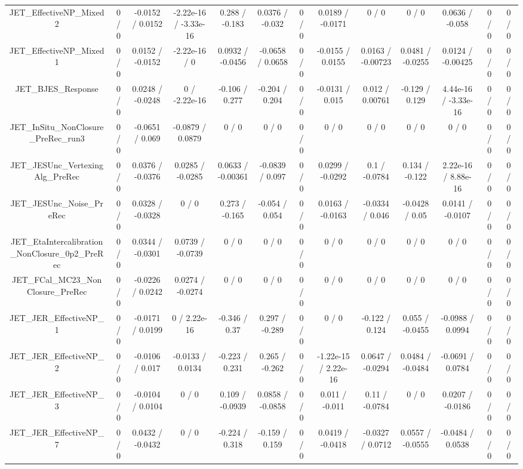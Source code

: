 \documentclass[10pt]{article}
\begin{document}
\begin{table}[htbp]
\begin{center}
\begin{tabular}{|c|c|c|c|c|c|c|c|c|c|c|c|c|}
  JET_EffectiveNP_Mixed2 & 0 / 0 & -0.0152 / 0.0152 & -2.22e-16 / -3.33e-16 & 0.288 / -0.183 & 0.0376 / -0.032 & 0 / 0 & 0.0189 / -0.0171 & 0 / 0 & 0 / 0 & 0.0636 / -0.058 & 0 / 0 & 0 / 0 \\ 
  JET_EffectiveNP_Mixed1 & 0 / 0 & 0.0152 / -0.0152 & -2.22e-16 / 0 & 0.0932 / -0.0456 & -0.0658 / 0.0658 & 0 / 0 & -0.0155 / 0.0155 & 0.0163 / -0.00723 & 0.0481 / -0.0255 & 0.0124 / -0.00425 & 0 / 0 & 0 / 0 \\ 
  JET_BJES_Response & 0 / 0 & 0.0248 / -0.0248 & 0 / -2.22e-16 & -0.106 / 0.277 & -0.204 / 0.204 & 0 / 0 & -0.0131 / 0.015 & 0.012 / 0.00761 & -0.129 / 0.129 & 4.44e-16 / -3.33e-16 & 0 / 0 & 0 / 0 \\ 
  JET_InSitu_NonClosure_PreRec_run3 & 0 / 0 & -0.0651 / 0.069 & -0.0879 / 0.0879 & 0 / 0 & 0 / 0 & 0 / 0 & 0 / 0 & 0 / 0 & 0 / 0 & 0 / 0 & 0 / 0 & 0 / 0 \\ 
  JET_JESUnc_VertexingAlg_PreRec & 0 / 0 & 0.0376 / -0.0376 & 0.0285 / -0.0285 & 0.0633 / -0.00361 & -0.0839 / 0.097 & 0 / 0 & 0.0299 / -0.0292 & 0.1 / -0.0784 & 0.134 / -0.122 & 2.22e-16 / 8.88e-16 & 0 / 0 & 0 / 0 \\ 
  JET_JESUnc_Noise_PreRec & 0 / 0 & 0.0328 / -0.0328 & 0 / 0 & 0.273 / -0.165 & -0.054 / 0.054 & 0 / 0 & 0.0163 / -0.0163 & -0.0334 / 0.046 & -0.0428 / 0.05 & 0.0141 / -0.0107 & 0 / 0 & 0 / 0 \\ 
  JET_EtaIntercalibration_NonClosure_0p2_PreRec & 0 / 0 & 0.0344 / -0.0301 & 0.0739 / -0.0739 & 0 / 0 & 0 / 0 & 0 / 0 & 0 / 0 & 0 / 0 & 0 / 0 & 0 / 0 & 0 / 0 & 0 / 0 \\ 
  JET_FCal_MC23_NonClosure_PreRec & 0 / 0 & -0.0226 / 0.0242 & 0.0274 / -0.0274 & 0 / 0 & 0 / 0 & 0 / 0 & 0 / 0 & 0 / 0 & 0 / 0 & 0 / 0 & 0 / 0 & 0 / 0 \\ 
  JET_JER_EffectiveNP_1 & 0 / 0 & -0.0171 / 0.0199 & 0 / 2.22e-16 & -0.346 / 0.37 & 0.297 / -0.289 & 0 / 0 & 0 / 0 & -0.122 / 0.124 & 0.055 / -0.0455 & -0.0988 / 0.0994 & 0 / 0 & 0 / 0 \\ 
  JET_JER_EffectiveNP_2 & 0 / 0 & -0.0106 / 0.017 & -0.0133 / 0.0134 & -0.223 / 0.231 & 0.265 / -0.262 & 0 / 0 & -1.22e-15 / 2.22e-16 & 0.0647 / -0.0294 & 0.0484 / -0.0484 & -0.0691 / 0.0784 & 0 / 0 & 0 / 0 \\ 
  JET_JER_EffectiveNP_3 & 0 / 0 & -0.0104 / 0.0104 & 0 / 0 & 0.109 / -0.0939 & 0.0858 / -0.0858 & 0 / 0 & 0.011 / -0.011 & 0.11 / -0.0784 & 0 / 0 & 0.0207 / -0.0186 & 0 / 0 & 0 / 0 \\ 
  JET_JER_EffectiveNP_7 & 0 / 0 & 0.0432 / -0.0432 & 0 / 0 & -0.224 / 0.318 & -0.159 / 0.159 & 0 / 0 & 0.0419 / -0.0418 & -0.0327 / 0.0712 & 0.0557 / -0.0555 & -0.0484 / 0.0538 & 0 / 0 & 0 / 0 \\ 

\end{tabular}
\end{center}
\end{table}
\end{document}
